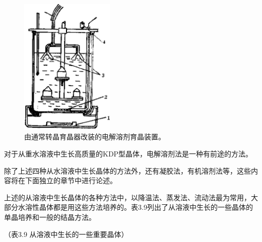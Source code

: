 \begin{figure}[htbp]
 \centering
 \includegraphics[width=0.4\textwidth]{fig/cp03/img3.26.jpg}
 \caption{由通常转晶育晶器改装的电解溶剂育晶装置。}
\end{figure}

对于从重水溶液中生长高质量的KDP型晶体，电解溶剂法是一种有前途的方法。

除了上述四种从水溶液中生长晶体的方法外，还有凝胶法，有机溶剂法等，这些内容将在下面独立的章节中进行论述。

上述的从溶液中生长晶体的各种方法中，以降温法、蒸发法、流动法最为常用，大部分水溶性晶体都是用这些方法培养的。表3.9列出了从溶液中生长的一些晶体的单晶培养和一般的结晶方法。

（表3.9  从溶液中生长的一些重要晶体）


